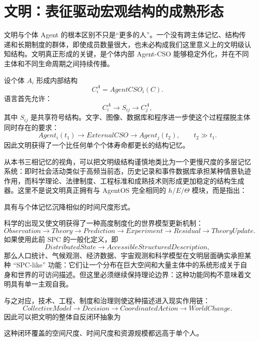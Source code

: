 \section{文明：表征驱动宏观结构的成熟形态}

文明与个体 Agent 的根本区别不只是“更多的人”。一个没有跨主体记忆、结构传递和长期制度的群体，即使成员数量很大，也未必构成我们这里意义上的文明级认知结构。文明真正形成的关键，是个体内部 Agent-CSO 能够稳定外化，并在不同主体和不同生命周期之间持续传播。

设个体 $A_i$ 形成内部结构
\[
C_i^{A}=AgentCSO_i(C).
\]
语言首先允许：
\[
C_i^{A}
\rightarrow
S_{ij}
\rightarrow
C_j^{A},
\]
其中 $S_{ij}$ 是共享符号结构。文字、图像、数据库和程序进一步使这个过程摆脱主体同时存在的要求：
\[
Agent_i(t_1)
\rightarrow
ExternalCSO
\rightarrow
Agent_j(t_2),
\qquad
t_2\gg t_1.
\]
因此文明获得了一个比任何单个个体寿命都更长的结构记忆。

从本书三相记忆的视角，可以把文明级结构谨慎地类比为一个更慢尺度的多层记忆系统：即时社会活动类似于高频当前态，历史记录和事件数据库承担某种情景轨迹作用，而科学理论、法律制度、工程标准和成熟技术则形成更加稳定的结构生成器。这里不是说文明真正拥有与 AgentOS 完全相同的 $h/E/\Theta$ 模块，而是指出：
\begin{statementbox}
\centering
{}
\end{statementbox}
具有与个体记忆沉降相似的时间尺度形式。

科学的出现又使文明获得了一种高度制度化的世界模型更新机制：
\[
Observation
\rightarrow
Theory
\rightarrow
Prediction
\rightarrow
Experiment
\rightarrow
Residual
\rightarrow
TheoryUpdate.
\]
如果使用此前 SPC 的一般化定义，即
\[
DistributedState
\rightarrow
AccessibleStructuredDescription,
\]
那么人口统计、气候观测、经济数据、宇宙观测和科学模型在文明层面确实承担某种 ``SPC-like'' 功能：它们让一个分布在巨大空间和大量主体中的系统形成关于自身和世界的可访问描述。但这里必须继续保持理论边界：这种功能同构不意味着文明具有单一主观自我。

与之对应，技术、工程、制度和治理则使这种描述进入现实作用链：
\[
CollectiveModel
\rightarrow
Decision
\rightarrow
CoordinatedAction
\rightarrow
WorldChange.
\]
因此可以把文明的整体自反闭环抽象为
\begin{statementbox}
\centering
{}
\end{statementbox}
这种闭环覆盖的空间尺度、时间尺度和资源规模都远高于单个人。

